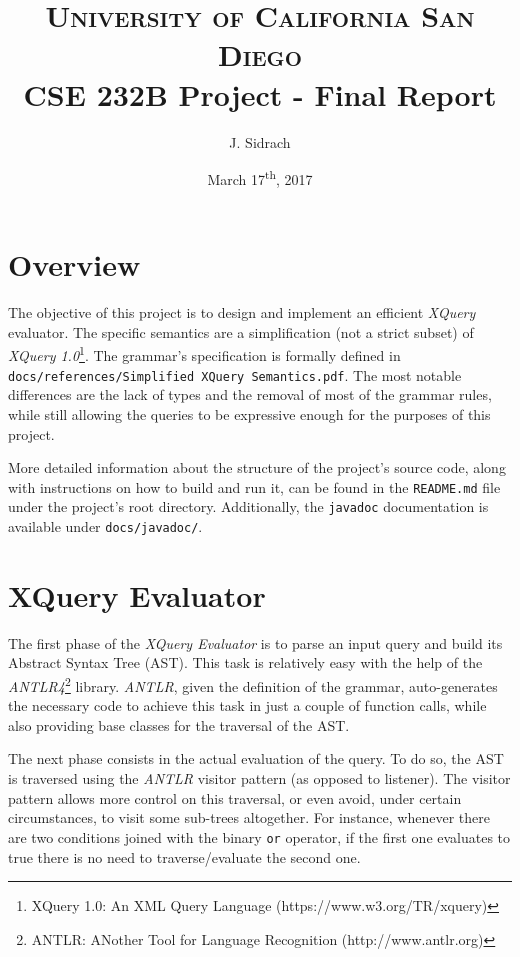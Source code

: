 \documentclass[paper=letter, fontsize=11pt]{scrartcl}
\title{
\normalfont \normalsize
\textsc{University of California San Diego} \\ [25pt]
\huge CSE 232B Project - Final Report \\
}
\author{J. Sidrach}
\date{\normalsize{March 17\textsuperscript{th}, 2017}}
\begin{document}
\maketitle

\section{Overview}

The objective of this project is to design and implement an efficient \textit{XQuery} evaluator.
The specific semantics are a simplification (not a strict subset) of \textit{XQuery 1.0}\footnote{XQuery 1.0: An XML Query Language (https://www.w3.org/TR/xquery)}.
The grammar's specification is formally defined in \texttt{docs/references/Simplified XQuery Semantics.pdf}.
The most notable differences are the lack of types and the removal of most of the grammar rules, while still allowing the queries to be expressive enough for the purposes of this project.

More detailed information about the structure of the project's source code, along with instructions on how to build and run it, can be found in the \texttt{README.md} file under the project's root directory.
Additionally, the \texttt{javadoc} documentation is available under \texttt{docs/javadoc/}.

\section{XQuery Evaluator}

The first phase of the \textit{XQuery Evaluator} is to parse an input query and build its Abstract Syntax Tree (AST).
This task is relatively easy with the help of the \textit{ANTLR4}\footnote{ANTLR: ANother Tool for Language Recognition (http://www.antlr.org)} library.
\textit{ANTLR}, given the definition of the grammar, auto-generates the necessary code to achieve this task in just a couple of function calls, while also providing base classes for the traversal of the AST.

The next phase consists in the actual evaluation of the query.
To do so, the AST is traversed using the \textit{ANTLR} visitor pattern (as opposed to listener).
The visitor pattern allows more control on this traversal, or even avoid, under certain circumstances, to visit some sub-trees altogether.
For instance, whenever there are two conditions joined with the binary \texttt{or} operator, if the first one evaluates to true there is no need to traverse/evaluate the second one.
\end{document}
